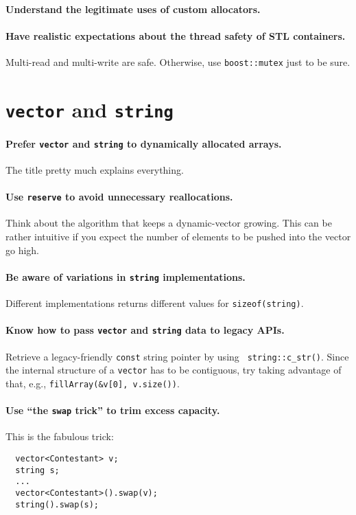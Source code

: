 \documentclass{article}
\begin{document}
\paragraph{Understand the legitimate uses of custom allocators.}

\paragraph{Have realistic expectations about the thread safety of STL
containers.}  Multi-read and multi-write are safe.  Otherwise, use 
{\tt boost::mutex} just to be sure.

\section{{\tt vector} and {\tt string}}

\paragraph{Prefer {\tt vector} and {\tt string} to dynamically allocated
arrays.} The title pretty much explains everything.

\paragraph{Use {\tt reserve} to avoid unnecessary reallocations.}  Think about
the algorithm that keeps a dynamic-vector growing.  This can be rather
intuitive if you expect the number of elements to be pushed into the vector go
high.

\paragraph{Be aware of variations in {\tt string} implementations.}
Different implementations returns different values for {\tt sizeof(string)}. 

\paragraph{Know how to pass {\tt vector} and {\tt string} data to legacy APIs.}
Retrieve a legacy-friendly {\tt const} string pointer by using {\tt
string::c\_str()}.  Since the internal structure of a {\tt vector} has to be
contiguous, try taking advantage of that, e.g., {\tt fillArray(\&v[0],
v.size())}.

\paragraph{Use ``the {\tt swap} trick'' to trim excess capacity.}
This is the fabulous trick:
\begin{verbatim}
  vector<Contestant> v;
  string s;
  ...
  vector<Contestant>().swap(v);
  string().swap(s);
\end{verbatim}
\end{document}
